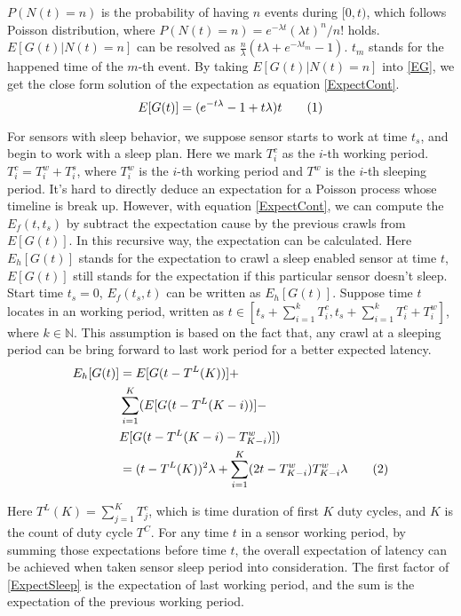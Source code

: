 \documentclass[conference]{IEEEtran}
\newcommand\numberthis{\addtocounter{equation}{1}\tag{\theequation}}
\begin{document}
$P(N(t)=n)$ is the probability of having $n$ events during $[0,t)$, which follows Poisson distribution, where $P(N(t)=n)=e^{-\lambda t}{(\lambda t)^n}/{n!}$ holds. 
$E[G(t)|N(t)=n]$ can be resolved as $\frac{n}{\lambda}(t\lambda+e^{-\lambda t_m}-1)$. 
$t_{m}$ stands for the happened time of the $m$-th event. 
By taking $E[G(t)|N(t)=n]$ into \eqref{EG}, we get the close form solution of the expectation as equation \eqref{ExpectCont}.
\begin{equation}
E[G(t)] = (e^{-t\lambda}-1+t \lambda)t \numberthis \label{ExpectCont}
\end{equation}

For sensors with sleep behavior, we suppose sensor starts to work at time $t_s$, and begin to work with a sleep plan.
Here we mark $T^{c}_{i}$ as the $i$-th working period. 
$T^{c}_{i} = T^{w}_{i}+T^{s}_{i}$, where $T^{w}_{i}$ is the $i$-th working period and $T^{w}$ is the $i$-th sleeping period. 
It's hard to directly deduce an expectation for a Poisson process whose timeline is break up.
However, with equation \eqref{ExpectCont}, we can compute the $E_f(t, t_s)$ by subtract the expectation cause by the previous crawls from $E[G(t)]$. 
In this recursive way, the expectation can be calculated. 
Here $E_h[G(t)]$ stands for the expectation to crawl a sleep enabled sensor at time $t$, $E[G(t)]$ still stands for the expectation if this particular sensor doesn't sleep.
Start time $t_s=0$, $E_f(t_s,t)$ can be written as $E_h[G(t)]$.
Suppose time $t$ locates in an working period, written as $t \in [t_s + \sum_{i=1}^{k} T^{c}_{i}, t_s + \sum_{i=1}^{k} T^{c}_{i} + T^{w}_{i}]$, where $k\in\mathbb{N}$. 
This assumption is based on the fact that, any crawl at a sleeping period can be bring forward to last work period for a better expected latency.
\begin{align*}
E_h[G(t)] & = E[G(t-T^{L}(K))] + \\
	& \sum_{i=1}^{K}(E[G(t-T^{L}(K-i))]-\\
	& E[G(t-T^{L}(K-i)-T^{w}_{K-i})])\\
	& = (t-T^{L}(K))^2\lambda + \sum_{i=1}^{K} (2 t - T^{w}_{K-i})T^{w}_{K-i}\lambda 
	\numberthis \label{ExpectSleep}
\end{align*}

Here $T^{L}(K) = \sum_{j=1}^{K} T^{c}_{j}$, which is time duration of first $K$ duty cycles, and $K$ is the count of duty cycle $T^{C}$. 
For any time $t$ in a sensor working period, by summing those expectations before time $t$, the overall expectation of latency can be achieved when taken sensor sleep period into consideration. 
The first factor of \eqref{ExpectSleep} is the expectation of last working period, and the sum is the expectation of the previous working period.
\end{document}
